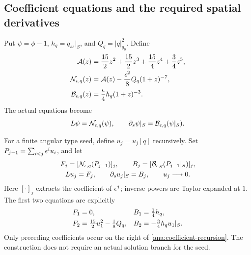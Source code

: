 \subsection{Coefficient equations and the required spatial derivatives}

Put $\psi=\phi-1$, $h_q=q_{ss}|_S$, and $Q_q=|q|_{g_0}^2$.  Define
\begin{align}
 \mathcal A(z)&=\frac{15}{2}z^2+\frac{15}{2}z^3
                    +\frac{15}{4}z^4+\frac34z^5,\notag\\
 \mathcal N_{\epsilon,q}(z)&=\mathcal A(z)
                    -\frac{\epsilon^2}{8}Q_q(1+z)^{-7},\notag\\
 \mathcal B_{\epsilon,q}(z)&=\frac{\epsilon}{4}h_q(1+z)^{-3}.
 \label{ana:nonlinearities}
\end{align}
The actual equations become
\begin{equation}
 L\psi=\mathcal N_{\epsilon,q}(\psi),\qquad
 \partial_s\psi|_S=\mathcal B_{\epsilon,q}(\psi|_S).
 \label{ana:actual-equations}
\end{equation}

For a finite angular type seed, define $u_j=u_j[q]$ recursively.
Set $P_{j-1}=\sum_{i<j}\epsilon^iu_i$, and let
\begin{equation}
 \begin{gathered}
 F_j=[\mathcal N_{\epsilon,q}(P_{j-1})]_j,
 \qquad B_j=[\mathcal B_{\epsilon,q}(P_{j-1}|_S)]_j,\\
 Lu_j=F_j,\qquad \partial_su_j|_S=B_j,
 \qquad u_j\longrightarrow0.
 \end{gathered}
 \label{ana:coefficient-recursion}
\end{equation}
Here $[\cdot]_j$ extracts the coefficient of $\epsilon^j$; inverse powers
are Taylor expanded at $1$.  The first two equations are explicitly
\begin{align}
 F_1&=0,& B_1&=\tfrac14h_q,\notag\\
 F_2&=\tfrac{15}{2}u_1^2-\tfrac18Q_q,
 & B_2&=-\tfrac34h_qu_1|_S.
 \label{ana:first-two}
\end{align}
Only preceding coefficients occur on the right of
\eqref{ana:coefficient-recursion}.  The construction does not require
an actual solution branch for the seed.

